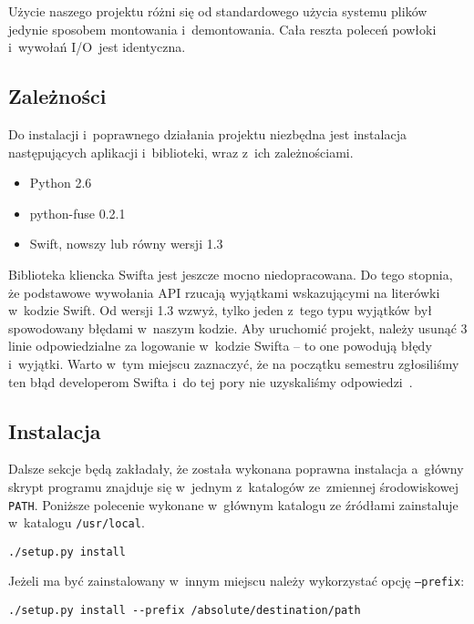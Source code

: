 Użycie naszego projektu różni się od standardowego użycia systemu plików
jedynie sposobem montowania i~demontowania. Cała reszta poleceń powłoki
i~wywołań I/O~jest identyczna.

\subsection{Zależności}\label{sec:zaleznosci}

Do instalacji i~poprawnego działania projektu \cb{} niezbędna jest instalacja
następujących aplikacji i~biblioteki, wraz z~ich zależnościami.

\begin{itemize}
	\item{Python 2.6}
	\item{python-fuse 0.2.1}
	\item{Swift, nowszy lub równy wersji 1.3}
\end{itemize}

Biblioteka kliencka Swifta jest jeszcze mocno niedopracowana. Do tego stopnia,
że podstawowe wywołania API rzucają wyjątkami wskazującymi na literówki
w~kodzie Swift. Od wersji 1.3 wzwyż, tylko jeden z~tego typu wyjątków był
spowodowany błędami w~naszym kodzie. Aby uruchomić projekt, należy usunąć 3
linie odpowiedzialne za logowanie w~kodzie Swifta -- to one powodują błędy
i~wyjątki. Warto w~tym miejscu zaznaczyć, że na początku semestru zgłosiliśmy
ten błąd developerom Swifta i~do tej pory nie uzyskaliśmy
odpowiedzi~\cite{launchpad-bug}.

\subsection{Instalacja}

Dalsze sekcje będą zakładały, że została wykonana poprawna instalacja a~główny
skrypt programu znajduje się w~jednym z~katalogów ze~zmiennej środowiskowej
\texttt{PATH}. Poniższe polecenie wykonane w~głównym katalogu ze źródłami
zainstaluje \cb{} w~katalogu \texttt{/usr/local}.

\begin{verbatim}
./setup.py install
\end{verbatim}

Jeżeli \cb{} ma być zainstalowany w~innym miejscu należy wykorzystać opcję
\texttt{--prefix}:

\begin{verbatim}
./setup.py install --prefix /absolute/destination/path
\end{verbatim}


